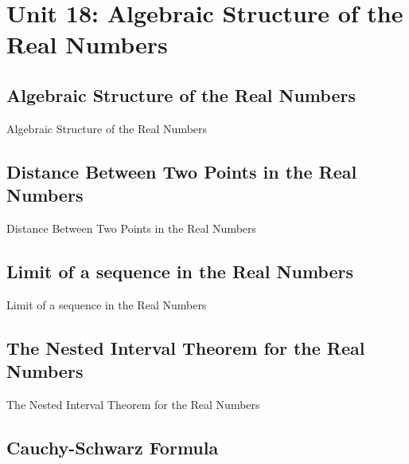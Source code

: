 \chapter{Unit 18: Algebraic Structure of the Real Numbers}
\label{chap:unit18}

\section{Algebraic Structure of the Real Numbers}
\label{sec:algebraic-structure-of-the-real-numbers}

Algebraic Structure of the Real Numbers

\section{Distance Between Two Points in the Real Numbers}
\label{sec:distance-between-two-points-in-the-real-numbers}

Distance Between Two Points in the Real Numbers

\section{Limit of a sequence in the Real Numbers}
\label{sec:limit-of-a-sequence-in-the-real-numbers}

Limit of a sequence in the Real Numbers

\section{The Nested Interval Theorem for the Real Numbers}
\label{sec:the-nested-interval-theorem-for-the-real-numbers}

The Nested Interval Theorem for the Real Numbers

\section{Cauchy-Schwarz Formula}
\label{sec:cauchy-schwarz-formula}

